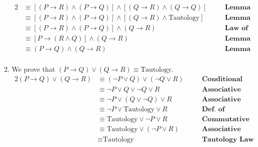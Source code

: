 \begin{enumerate}[label=(\alph*)]
\begin{alignat*}{2}
        &\equiv [(P \rightarrow R) \wedge (P \rightarrow Q)] \wedge [(Q \rightarrow R) \wedge (Q \rightarrow Q)] && \quad \textbf{Lemma 7.a.2}\\
        &\equiv [(P \rightarrow R) \wedge (P \rightarrow Q)] \wedge [(Q \rightarrow R) \wedge \text{Tautology}] && \quad \textbf{Lemma 7.a.3}\\
        &\equiv [(P \rightarrow R) \wedge (P \rightarrow Q)] \wedge (Q \rightarrow R) && \quad \textbf{Law of Tautology}\\
        &\equiv [P \rightarrow (R \wedge Q)] \wedge (Q \rightarrow R) && \quad \textbf{Lemma 7.a.2}\\
        &\equiv (P \rightarrow Q) \wedge (Q \rightarrow R) && \quad \textbf{Lemma 7.a.1}\\
    \end{alignat*}

    \item We prove that $(P \rightarrow Q) \vee (Q \rightarrow R) \equiv \text{Tautology}$.
    \begin{alignat*}{2}
        (P \rightarrow Q) \vee (Q \rightarrow R) &\equiv (\neg P \vee Q) \vee (\neg Q \vee R) && \quad \textbf{Conditional Law}\\
        &\equiv \neg P \vee Q \vee \neg Q \vee R && \quad \textbf{Associative Law}\\
        &\equiv \neg P \vee (Q \vee \neg Q) \vee R && \quad \textbf{Associative Law}\\
        &\equiv \neg P \vee \text{Tautology} \vee R && \quad \textbf{Def. of Tautology}\\
        &\equiv \text{Tautology} \vee \neg P \vee R && \quad \textbf{Commutative Law}\\
        &\equiv \text{Tautology} \vee (\neg P \vee R) && \quad \textbf{Associative Law}\\
        &\equiv \text{Tautology} && \quad \textbf{Tautology Law}\\
    \end{alignat*}
\end{enumerate}
\pagebreak
